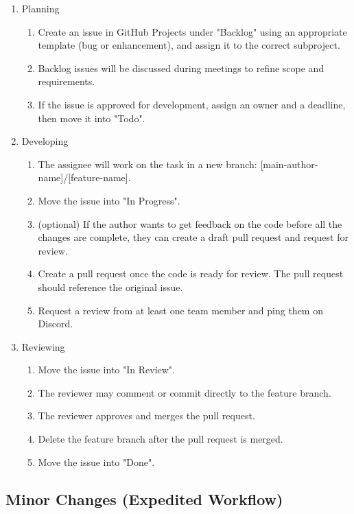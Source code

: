 \documentclass{article}
\begin{document}
\begin{enumerate}
  \item Planning
        \begin{enumerate}
          \item Create an issue in GitHub Projects under "Backlog" using an appropriate
                template (bug or enhancement), and assign it to the correct subproject.
          \item Backlog issues will be discussed during meetings to refine scope and
                requirements.
          \item If the issue is approved for development, assign an owner and a deadline, then
                move it into "Todo".
        \end{enumerate}
  \item Developing
        \begin{enumerate}
          \item The assignee will work on the task in a new branch:
                [main-author-name]/[feature-name].
          \item Move the issue into "In Progress".
          \item (optional) If the author wants to get feedback on the code before all the
                changes are complete, they can create a draft pull request and request for
                review.
          \item Create a pull request once the code is ready for review. The pull request
                should reference the original issue.
          \item Request a review from at least one team member and ping them on Discord.
        \end{enumerate}
  \item Reviewing
        \begin{enumerate}
          \item Move the issue into "In Review".
          \item The reviewer may comment or commit directly to the feature branch.
          \item The reviewer approves and merges the pull request.
          \item Delete the feature branch after the pull request is merged.
          \item Move the issue into "Done".
        \end{enumerate}
\end{enumerate}

\subsection{Minor Changes (Expedited Workflow)}
\end{document}
